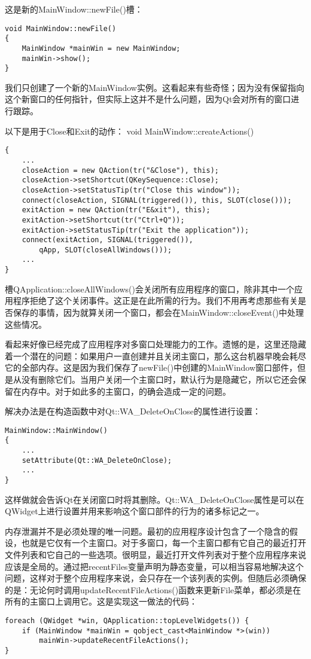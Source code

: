 \documentclass[11pt,oneside]{book}
\begin{document}
\begin{common-format}
这是新的MainWindow::newFile()槽：
\begin{Verbatim}
void MainWindow::newFile()
{
    MainWindow *mainWin = new MainWindow;
    mainWin->show();
}
\end{Verbatim}

我们只创建了一个新的MainWindow实例。这看起来有些奇怪；因为没有保留指向这个新窗口的任何指针，但实际上这并不是什么问题，因为Qt会对所有的窗口进行跟踪。

以下是用于Close和Exit的动作：
void MainWindow::createActions()
\begin{Verbatim}
{
    ...
    closeAction = new QAction(tr("&Close"), this);
    closeAction->setShortcut(QKeySequence::Close);
    closeAction->setStatusTip(tr("Close this window"));
    connect(closeAction, SIGNAL(triggered()), this, SLOT(close()));
    exitAction = new QAction(tr("E&xit"), this);
    exitAction->setShortcut(tr("Ctrl+Q"));
    exitAction->setStatusTip(tr("Exit the application"));
    connect(exitAction, SIGNAL(triggered()),
        qApp, SLOT(closeAllWindows()));
    ...
}
\end{Verbatim}

槽QApplication::closeAllWindows()会关闭所有应用程序的窗口，除非其中一个应用程序拒绝了这个关闭事件。这正是在此所需的行为。我们不用再考虑那些有关是否保存的事情，因为就算关闭一个窗口，都会在MainWindow::closeEvent()中处理这些情况。

看起来好像已经完成了应用程序对多窗口处理能力的工作。遗憾的是，这里还隐藏着一个潜在的问题：如果用户一直创建并且关闭主窗口，那么这台机器早晚会耗尽它的全部内存。这是因为我们保存了newFile()中创建的MainWindow窗口部件，但是从没有删除它们。当用户关闭一个主窗口时，默认行为是隐藏它，所以它还会保留在内存中。对于如此多的主窗口，的确会造成一定的问题。

解决办法是在构造函数中对Qt::WA\_{}DeleteOnClose的属性进行设置：
\begin{Verbatim}
MainWindow::MainWindow()
{
    ...
    setAttribute(Qt::WA_DeleteOnClose);
    ...
}
\end{Verbatim}

这样做就会告诉Qt在关闭窗口时将其删除。Qt::WA\_{}DeleteOnClose属性是可以在QWidget上进行设置并用来影响这个窗口部件的行为的诸多标记之一。

内存泄漏并不是必须处理的唯一问题。最初的应用程序设计包含了一个隐含的假设，也就是它仅有一个主窗口。对于多窗口，每一个主窗口都有它自己的最近打开文件列表和它自己的一些选项。很明显，最近打开文件列表对于整个应用程序来说应该是全局的。通过把recentFiles变量声明为静态变量，可以相当容易地解决这个问题，这样对于整个应用程序来说，会只存在一个该列表的实例。但随后必须确保的是：无论何时调用updateRecentFileActions()函数来更新File菜单，都必须是在所有的主窗口上调用它。这是实现这一做法的代码：
\begin{Verbatim}
foreach (QWidget *win, QApplication::topLevelWidgets()) {
    if (MainWindow *mainWin = qobject_cast<MainWindow *>(win))
        mainWin->updateRecentFileActions();
}
\end{Verbatim}


\end{common-format}
\end{document}
